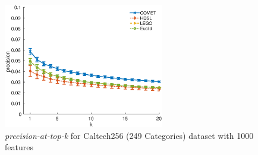 \documentclass[twoside,11pt]{article}
\begin{document}
\begin{figure}[h]
\centering
\includegraphics[width=7cm]{precision@k_Caltech256_with_249Categories}
\captionsetup{font=small}
\caption*{\textit{precision-at-top-k} for Caltech256 (249 Categories) dataset with 1000 features}
\end{figure}

\vskip 0.2in
\clearpage 

\end{document}
